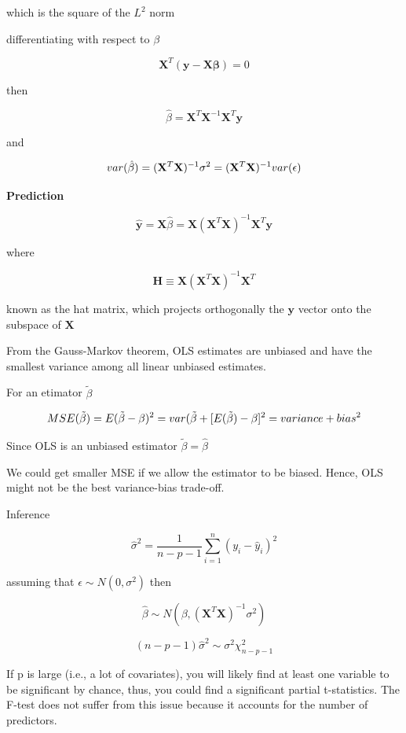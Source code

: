 \documentclass[
]{book}
\begin{document}
which is the square of the \(L^2\) norm

differentiating with respect to \(\beta\)

\[
\mathbf{X}^T  (\mathbf{y} - \mathbf{X\beta}) = 0 
\]

then

\[
\hat{\beta} = \mathbf{X}^T\mathbf{X}^{-1}\mathbf{X}^T \mathbf{y}
\]

and

\[
var(\hat{\beta}) = (\mathbf{X}^T \mathbf{X})^{-1} \sigma^2 \\
 = (\mathbf{X}^T \mathbf{X})^{-1} var(\epsilon)
\]

\textbf{Prediction}

\[
\hat{\mathbf{y}} = \mathbf{X} \hat{\beta} = \mathbf{X}(\mathbf{X}^T \mathbf{X})^{-1}\mathbf{X}^T\mathbf{y}
\]

where

\[
\mathbf{H} \equiv \mathbf{X}(\mathbf{X}^T \mathbf{X})^{-1}\mathbf{X}^T
\]

known as the hat matrix, which projects orthogonally the \(\mathbf{y}\) vector onto the subspace of \(\mathbf{X}\)

From the Gauss-Markov theorem, OLS estimates are unbiased and have the smallest variance among all linear unbiased estimates.

For an etimator \(\tilde{\beta}\)

\[
MSE(\tilde{\beta}) = E(\tilde{\beta} - \beta)^2 = var(\tilde{\beta} + [E(\tilde{\beta}) - \beta]^2 \\
 = variance + bias ^2 
\]

Since OLS is an unbiased estimator \(\tilde{\beta} = \hat{\beta}\)

We could get smaller MSE if we allow the estimator to be biased. Hence, OLS might not be the best variance-bias trade-off.

Inference

\[
\hat{\sigma}^2 = \frac{1}{n - p - 1} \sum_{i=1}^n (y_i - \hat{y}_i)^2
\]

assuming that \(\epsilon \sim N(0, \sigma^2)\) then

\[
\hat{\beta} \sim N(\beta, (\mathbf{X}^T \mathbf{X})^{-1}\sigma^2)
\]

\[
(n-p-1) \hat{\sigma}^2 \sim \sigma^2 \chi^2_{n-p-1}
\]

If p is large (i.e., a lot of covariates), you will likely find at least one variable to be significant by chance, thus, you could find a significant partial t-statistics. The F-test does not suffer from this issue because it accounts for the number of predictors.
\end{document}
